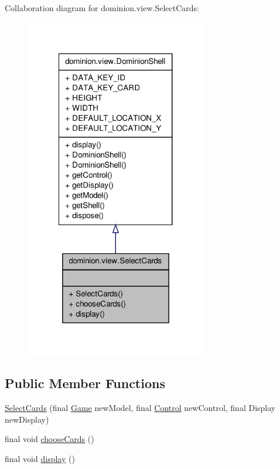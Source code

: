 \-Collaboration diagram for dominion.\-view.\-Select\-Cards\-:
\nopagebreak
\begin{figure}[H]
\begin{center}
\leavevmode
\includegraphics[width=224pt]{classdominion_1_1view_1_1SelectCards__coll__graph}
\end{center}
\end{figure}
\subsection*{\-Public \-Member \-Functions}
\begin{DoxyCompactItemize}
\item 
\hyperlink{classdominion_1_1view_1_1SelectCards_ae8d644ecdd64d98164809b5131045dc0}{\-Select\-Cards} (final \hyperlink{interfacedominion_1_1model_1_1Game}{\-Game} new\-Model, final \hyperlink{interfacedominion_1_1control_1_1Control}{\-Control} new\-Control, final \-Display new\-Display)
\item 
final void \hyperlink{classdominion_1_1view_1_1SelectCards_a34f8bcdc692a7d65dd67ac2349a60335}{choose\-Cards} ()
\item 
final void \hyperlink{classdominion_1_1view_1_1SelectCards_af3283a312f6fd11c92998ea892803848}{display} ()
\end{DoxyCompactItemize}


